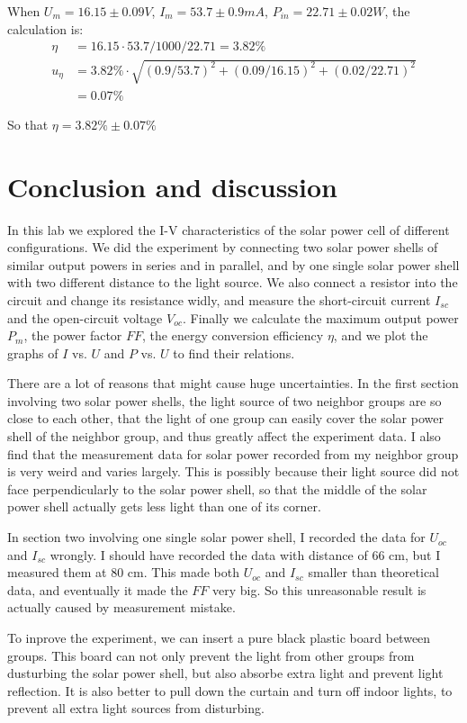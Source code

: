 \documentclass[12pt, a4paper]{article}
\begin{document}
When $U_m = 16.15\pm 0.09 V $, $I_m = 53.7\pm 0.9 mA$, $P_{in} = 22.71 \pm 0.02 W $, the calculation is:
\begin{align*}
	\eta &= 16.15 \cdot 53.7 / 1000 / 22.71 = 3.82 \% \\
	u_{\eta} &= 3.82\% \cdot \sqrt{(0.9/53.7)^2+(0.09/16.15)^2+(0.02/22.71)^2} \\
	         &= 0.07\%
\end{align*}

So that $\eta = 3.82\% \pm 0.07 \%$

\section{Conclusion and discussion}
In this lab we explored the  I-V characteristics of the solar power cell of different configurations. We did the 
experiment by connecting two solar power shells of similar output powers in series and in parallel, and by one single 
solar power shell with two different distance to the light source. We also connect a 
resistor into the circuit and change its resistance widly, and measure the short-circuit current 
$I_{sc}$ and the open-circuit voltage $V_{oc}$. Finally we calculate the maximum output power $P_m$, the power factor 
$FF$, the energy conversion efficiency $\eta$, and we plot the graphs of $I$ vs. $U$ and 
$P$ vs. $U$ to find their relations.

There are a lot of reasons that might cause huge uncertainties. In the first section involving two solar power shells, 
the light source of two neighbor groups are so close to each other, that the light of one group can easily cover the solar 
power shell of the neighbor group, and thus greatly affect the experiment data. I also find that the measurement data 
for solar power recorded from my neighbor group is very weird and varies largely. This is possibly because their light source 
did not face perpendicularly to the solar power shell, so that the middle of the solar power shell actually gets 
less light than one of its corner.

In section two involving one single solar power shell, I recorded the data for $U_{oc}$ and $I_{sc}$ wrongly. I should have 
recorded the data with distance of 66 cm, but I measured them at 80 cm. This made both $U_{oc}$ and $I_{sc}$ smaller than 
theoretical data, and eventually it made the $FF$ very big. So this unreasonable result is actually caused by measurement mistake. 

To inprove the experiment, we can insert a pure black plastic board between groups. This board can not only prevent the light 
from other groups from dusturbing the solar power shell, but also absorbe extra light and prevent light reflection. It is also better 
to pull down the curtain and turn off indoor lights, to prevent all extra light sources from disturbing.
\end{document}
